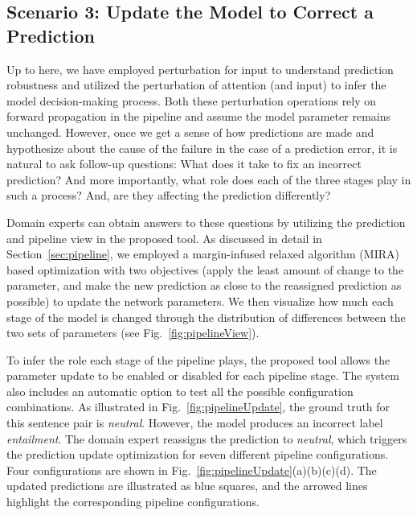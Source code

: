 





\subsection{Scenario 3: Update the Model to Correct a Prediction}
Up to here, we have employed perturbation for input to understand prediction robustness and utilized the perturbation of attention (and input) to infer the model decision-making process. Both these perturbation operations rely on forward propagation in the pipeline and assume the model parameter remains unchanged.
%
However, once we get a sense of how predictions are made and hypothesize about the cause of the failure in the case of a prediction error, it is natural to ask follow-up questions: What does it take to fix an incorrect prediction? And more importantly, what role does each of the three stages play in such a process? And, are they affecting the prediction differently?

Domain experts can obtain answers to these questions by utilizing the prediction and pipeline view in the proposed tool. As discussed in detail in Section~\ref{sec:pipeline}, we employed a margin-infused relaxed algorithm (MIRA) based optimization with two objectives (apply the least amount of change to the parameter, and make the new prediction as close to the reassigned prediction as possible) to update the network parameters.
%
We then visualize how much each stage of the model is changed through the distribution of differences between the two sets of parameters (see Fig.~\ref{fig:pipelineView}).

To infer the role each stage of the pipeline plays, the proposed tool allows the parameter update to be enabled or disabled for each pipeline stage.
The system also includes an automatic option to test all the possible configuration combinations. As illustrated in Fig.~\ref{fig:pipelineUpdate}, the ground truth for this sentence pair is \emph{neutral}. However, the model produces an incorrect label \emph{entailment}. The domain expert reassigns the prediction to \emph{neutral}, which triggers the prediction update optimization for seven different pipeline configurations. Four configurations are shown in Fig.~\ref{fig:pipelineUpdate}(a)(b)(c)(d). The updated predictions are illustrated as blue squares, and the arrowed lines highlight the corresponding pipeline configurations.

